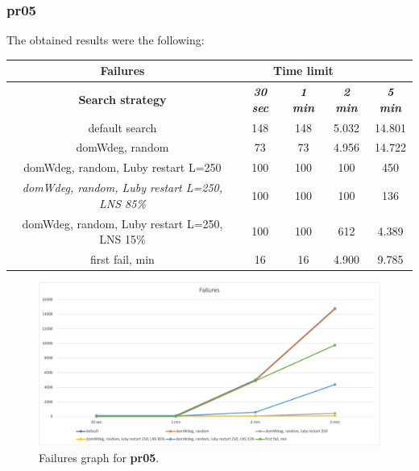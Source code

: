 \subsubsection{pr05}
\label{subsubsec:pr05}
The obtained results were the following:
{
\renewcommand{\arraystretch}{2}
\begin{longtable}[h]{| c | c | c | c | c |}
    \hline
    \textbf{Failures} & \multicolumn{3}{c}{\textbf{Time limit}} & \\
    \hline
    \textbf{Search strategy} & \textbf{\textit{30 sec}} & \textbf{\textit{1 min}} & \textbf{\textit{2 min}} & \textbf{\textit{5 min}} \\
    \hline
    \endhead
    default search                                         & 148 &  148 &  5.032 &  14.801 \\
    \hline
    domWdeg, random                                        &  73 &   73 &  4.956 &  14.722 \\
    \hline
    domWdeg, random, Luby restart L=250                    & 100 &  100 &   100 &    450 \\
    \hline
    \textit{domWdeg, random, Luby restart L=250, LNS 85\%} & 100 &  100 &   100 &    136 \\
    \hline
    domWdeg, random, Luby restart L=250, LNS 15\%          & 100 &  100 &   612 &   4.389 \\
    \hline
    first fail, min                                        &  16 &   16 &  4.900 &   9.785 \\
    \hline
\end{longtable}
}
\begin{figure}[H]
    \centering
    \includegraphics[width=0.8\columnwidth]{../graphs/pr05-failures.png}
    \caption{Failures graph for \textbf{pr05}.}
\end{figure}

